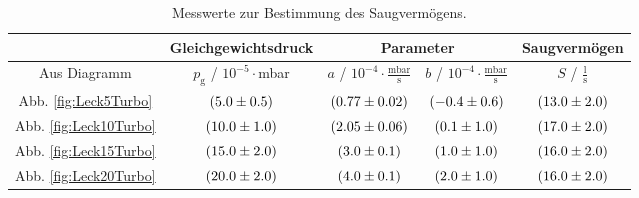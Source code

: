 \begin{table}
   \centering
   \caption{Messwerte zur Bestimmung des Saugvermögens.}
   \label{tab:SaugLeckTurbo}
   \begin{tabular}{c|c|c|c|c}
     & Gleichgewichtsdruck & \multicolumn{2}{c|}{Parameter} & Saugvermögen \\
     \hline
     Aus Diagramm & $p_\text{g}$ / $10^{-5}\cdot$mbar & $a$ / $10^{-4}\cdot \frac{\text{mbar}}{\text{s}}$ & $b$ / $10^{-4}\cdot \frac{\text{mbar}}{\text{s}}$ & $S$ / $\frac{\text{l}}{\text{s}}$ \\
     \hline
     Abb. \eqref{fig:Leck5Turbo} & $(\num{5 +- 0.5})$ & $(\num{0.77 +- 0.02})$ & $(\num{-0.4 +- 0.6})$ & $(\num{13.0 +- 2.0})$ \\
     Abb. \eqref{fig:Leck10Turbo} & $(\num{10.0 +- 1.0})$ & $(\num{2.05 +- 0.06})$ & $(\num{0.1 +- 1.0})$ & $(\num{17.0 +- 2.0}) $ \\
     Abb. \eqref{fig:Leck15Turbo} & $(\num{15.0 +- 2.0})$ & $(\num{3.0 +- 0.1})$ & $(\num{1.0 +- 1.0})$ & $(\num{16.0 +- 2.0}) $ \\
     Abb. \eqref{fig:Leck20Turbo} & $(\num{20.0 +- 2.0})$ & $(\num{4.0 +- 0.1})$ & $(\num{2.0 +- 1.0})$ & $(\num{16.0 +- 2.0}) $ \\
  \end{tabular}
\end{table}









%
